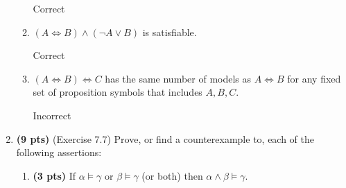 \documentclass{article}
\begin{document}
\begin{enumerate}
\begin{enumerate}[label=($\alph*$)]
    \color{blue}
        Correct
    \color{black}



    \item $(A \Leftrightarrow B) \wedge (\neg A \vee B)$ is satisfiable.

    \color{blue}
        Correct
    \color{black}



    \item $(A \Leftrightarrow B) \Leftrightarrow C$ has the same number of models as $A \Leftrightarrow B$ for any fixed set of proposition symbols that includes $A, B, C$.

    \color{blue}
        Incorrect
    \color{black}

    
    \end{enumerate}



\item \textbf{(9 pts)} (Exercise 7.7) Prove, or find a counterexample to, each of the following assertions:

    \begin{enumerate}[label=($\alph*$)]


    \item \textbf{(3 pts)} If $\alpha \models \gamma$ or $\beta \models \gamma$ (or both) then $\alpha \wedge \beta \models \gamma$.


\end{enumerate}
\end{enumerate}
\end{document}
